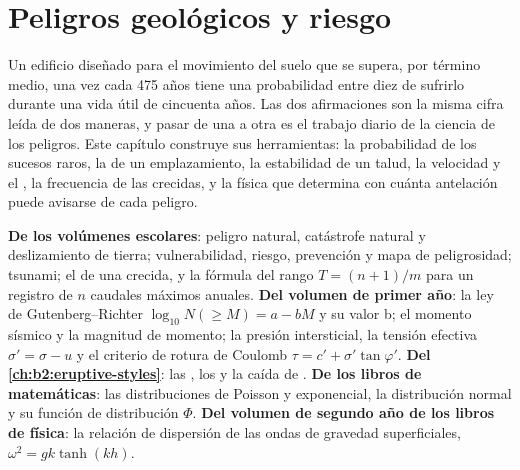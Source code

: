 \chapter{Peligros geológicos y riesgo}\label{ch:b2:geological-hazards}

Un edificio diseñado para el movimiento del suelo que se supera, por término medio, una vez cada 475 años tiene una
probabilidad entre diez de sufrirlo durante una vida útil de cincuenta años. Las dos afirmaciones son la misma cifra
leída de dos maneras, y pasar de una a otra es el trabajo diario de la ciencia de los peligros. Este capítulo
construye sus herramientas: la probabilidad de los sucesos raros, la  de un emplazamiento, la estabilidad de un
talud, la velocidad y el , la frecuencia de las crecidas, y la física que determina
con cuánta antelación puede avisarse de cada peligro.

\begin{recall}
\textbf{De los volúmenes escolares}: peligro natural, catástrofe natural y deslizamiento de tierra; vulnerabilidad,
riesgo, prevención y mapa de peligrosidad; tsunami; el  de una crecida, y la fórmula del rango
$T = (n + 1)/m$ para un registro de $n$ caudales máximos anuales. \textbf{Del volumen de primer año}: la
ley de Gutenberg--Richter $\log_{10} N(\geq M) = a - bM$ y su valor b; el momento sísmico y la magnitud
de momento; la presión intersticial, la tensión efectiva $\sigma' = \sigma - u$ y el criterio de rotura de
Coulomb $\tau = c' + \sigma' \tan\varphi'$. \textbf{Del \cref{ch:b2:eruptive-styles}}: las , los  y la caída de . \textbf{De los libros de matemáticas}: las distribuciones de Poisson y
exponencial, la distribución normal y su función de distribución $\Phi$.
\textbf{Del volumen de segundo año de los libros de física}: la relación de dispersión de las ondas de gravedad superficiales,
$\omega^2 = gk\tanh(kh)$.
\end{recall}

